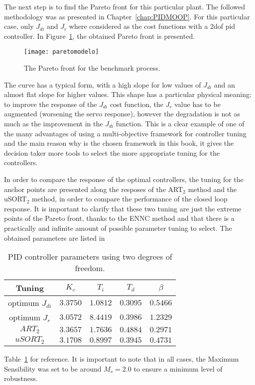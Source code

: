 The next step is to find the Pareto front for this particular plant. The followed methodology was as presented in Chapter~\ref{chap:PIDMOOP}. For this particular case, only $J_{di}$ and $J_r$ where considered as the cost functions with a \gls{2dof} \gls{pid} controller. In Figure~\ref{fig:paretomodelo}, the obtained Pareto front is presented. 
\begin{figure}[tb]%
	\centering
	\texttt{[image: paretomodelo]}%
	\caption{The Pareto front for the benchmark process.}%
	\label{fig:paretomodelo}%
\end{figure}

The curve has a typical form, with a high slope for low values of $J_{di}$ and an almost flat slope for higher values. This shape has a particular physical meaning: to improve the response of the $J_{di}$ cost function, the $J_{r}$ value has to be augmented (worsening the servo response), however the degradation is not as much as the improvement in the $J_{di}$ function. This is a clear example of one of the many advantages of using a multi-objective framework for controller tuning and the main reason why is the chosen framework in this book, it gives the decision taker more tools to select the more appropriate tuning for the controllers.

In order to compare the response of the optimal controllers, the tuning for the anchor points are presented along the resposes of the ART$_2$ method \citep{Vilanova2011} and the uSORT$_2$ method\citep{Alfaro2012a}, in order to compare the performance of the closed loop response. It is important to clarify that these two tuning are just the extreme points of the Pareto front, thanks to the ENNC method and that there is a practically and infinite amount of possible parameter tuning to select. The obtained parameters are listed in %
%
\begin{table}[tb]
	\caption{PID controller parameters using two degrees of freedom.}
	\centering
	\begin{tabular}{@{}*{5}{c}@{}}
		\toprule
		Tuning              &$K_c$       &$T_i$      &$T_d$     & $\beta$ 	\\
		\midrule              
		optimum $J_{di}$     &$3.3750$   & $1.0812$  &$0.3095$  &$0.5466$   \\
		optimum $J_{r}$      &$3.0572$   & $8.4419$  &$0.3986$  &$1.2329$   \\
		$ART_2$             &$3.3657$   & $1.7636$  &$0.4884$  &$0.2971$   \\
		$uSORT_2$           &$3.1708$   & $0.8997$  &$0.3945$  &$0.4731$   \\	
		\bottomrule				
	\end{tabular}
	\label{tab:parametroscontrolador}
\end{table}
%
Table~\ref{tab:parametroscontrolador} for reference. It is important to note that in all cases, the Maximum Sensibility was set to be around $M_s = 2.0$ to ensure a minimum level of robustness.

